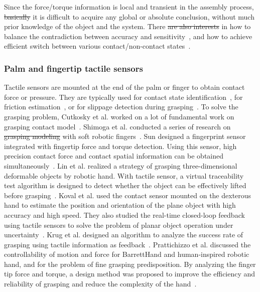 \documentclass[journal,twoside,web]{ieeecolor}
\providecommand{\DIFadd}[1]{{\protect\color{blue}\uwave{#1}}} %
\providecommand{\DIFdel}[1]{{\protect\color{red}\sout{#1}}}                      %
\providecommand{\DIFaddbegin}{} %
\providecommand{\DIFaddend}{} %
\providecommand{\DIFdelbegin}{} %
\providecommand{\DIFdelend}{} %
\newcommand{\DIFscaledelfig}{0.5}
\newlength{\DIFdelgraphicswidth} %
\newlength{\DIFdelgraphicsheight} %
\newcommand{\DIFaddincludegraphics}[2][]{{\color{blue}\fbox{\DIFOincludegraphics[#1]{#2}}}} %
\newcommand{\DIFdelincludegraphics}[2][]{%
\sbox{\DIFdelgraphicsbox}{\DIFOincludegraphics[#1]{#2}}%
\settoboxwidth{\DIFdelgraphicswidth}{\DIFdelgraphicsbox} %
\settoboxtotalheight{\DIFdelgraphicsheight}{\DIFdelgraphicsbox} %
\scalebox{\DIFscaledelfig}{%
\parbox[b]{\DIFdelgraphicswidth}{\usebox{\DIFdelgraphicsbox}\\[-\baselineskip] \rule{\DIFdelgraphicswidth}{0em}}\llap{\resizebox{\DIFdelgraphicswidth}{\DIFdelgraphicsheight}{%
\setlength{\unitlength}{\DIFdelgraphicswidth}%
\begin{picture}(1,1)%
\thicklines\linethickness{2pt} %
{\color[rgb]{1,0,0}\put(0,0){\framebox(1,1){}}}%
{\color[rgb]{1,0,0}\put(0,0){\line( 1,1){1}}}%
{\color[rgb]{1,0,0}\put(0,1){\line(1,-1){1}}}%
\end{picture}%
}\hspace*{3pt}}} %
} %
\DeclareRobustCommand{\DIFaddbegin}{\DIFOaddbegin \let\includegraphics\DIFaddincludegraphics} %
\DeclareRobustCommand{\DIFaddend}{\DIFOaddend \let\includegraphics\DIFOincludegraphics} %
\DeclareRobustCommand{\DIFdelbegin}{\DIFOdelbegin \let\includegraphics\DIFdelincludegraphics} %
\DeclareRobustCommand{\DIFdelend}{\DIFOaddend \let\includegraphics\DIFOincludegraphics} %
\begin{document}
Since the force/torque information is local and transient in the assembly process, \DIFdelbegin \DIFdel{basically }\DIFdelend it is difficult to acquire any global or absolute conclusion, without much prior knowledge of the object and the system. 
There \DIFdelbegin \DIFdel{are also interests }\DIFdelend \DIFaddbegin \DIFadd{is also an interest }\DIFaddend in how to balance the contradiction between accuracy and sensitivity~\cite{Sun2015,Miyashita2018}, and how to achieve \DIFaddbegin \DIFadd{an }\DIFaddend efficient switch between various contact/non-contact states~\cite{Zhang2013,Gracia2018}.

\subsubsection{Palm and fingertip tactile sensors} 

Tactile sensors are mounted at the end of the palm or finger to obtain contact force or pressure. 
They are typically used for contact state identification~\cite{Chu2018,Pirozzi2018,Abdeetedal2018a}, for friction estimation~\cite{Howea,Cutkosky1986,Montano2018}, or for slippage detection during grasping~\cite{Schuermann2012,Wong2016,Rana2016,Motamedi2017,Veiga2018}.
To solve the grasping problem, Cutkosky et al. worked on a lot of fundamental work on \DIFaddbegin \DIFadd{a }\DIFaddend grasping contact model~\cite{Cutkosky1986,Cutkosky1989,Cutkosky1989a,Howe1993}.
Shimoga et al. conducted a series of research on \DIFdelbegin \DIFdel{grasping modeling }\DIFdelend \DIFaddbegin \DIFadd{a grasping model }\DIFaddend with soft robotic fingers~\cite{Shimogaa,Shimoga1996,Shimoga1996a}. 
Sun designed a fingerprint sensor integrated with fingertip force and torque detection. Using this sensor, high precision contact force and contact spatial information can be obtained simultaneously~\cite{Sun2011}.
Lin et al. realized a strategy of grasping three-dimensional deformable objects by robotic hand. 
With \DIFaddbegin \DIFadd{a }\DIFaddend tactile sensor, a virtual traceability test algorithm is designed to detect whether the object can be effectively lifted before grasping~\cite{Lin2015a}. 
Koval et al. used the contact sensor mounted on the dexterous hand to estimate the position and orientation of the plane object with high accuracy and high speed. 
They also studied the real-time closed-loop feedback using tactile sensors to solve the problem of planar object operation under uncertainty~\cite{Koval2015}. 
Krug et al. designed an algorithm to analyze the success rate of grasping using tactile information as feedback~\cite{Krug2016}. 
Prattichizzo et al. discussed the controllability of motion and force for BarrettHand and human-inspired robotic hand, and for the problem of fine grasping predisposition. By analyzing the finger tip force and torque, a design method was proposed to improve the efficiency and reliability of grasping and reduce the complexity of the hand~\cite{Prattichizzo2013}.
\end{document}
